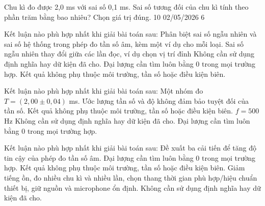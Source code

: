 \begin{ex}
Chu kì đo được 2,0 ms với sai số 0,1 ms. Sai số tương đối của chu kì tính theo phần trăm bằng bao nhiêu? Chọn giá trị đúng.
\choice
{10}
{02/05/2026}
{6}
{}
\end{ex}

\begin{ex}
Kết luận nào phù hợp nhất khi giải bài toán sau: Phân biệt sai số ngẫu nhiên và sai số hệ thống trong phép đo tần số âm, kèm một ví dụ cho mỗi loại.
\choice
{\True Sai số ngẫu nhiên thay đổi giữa các lần đọc, ví dụ chọn vị trí đỉnh}
{Không cần sử dụng định nghĩa hay dữ kiện đã cho.}
{Đại lượng cần tìm luôn bằng 0 trong mọi trường hợp.}
{Kết quả không phụ thuộc môi trường, tần số hoặc điều kiện biên.}
\end{ex}

\begin{ex}
Kết luận nào phù hợp nhất khi giải bài toán sau: Một nhóm đo $T=(2,00\pm0,04)$ ms. Ước lượng tần số và độ không đảm bảo tuyệt đối của tần số.
\choice
{Kết quả không phụ thuộc môi trường, tần số hoặc điều kiện biên.}
{\True $f=500$ Hz}
{Không cần sử dụng định nghĩa hay dữ kiện đã cho.}
{Đại lượng cần tìm luôn bằng 0 trong mọi trường hợp.}
\end{ex}

\begin{ex}
Kết luận nào phù hợp nhất khi giải bài toán sau: Đề xuất ba cải tiến để tăng độ tin cậy của phép đo tần số âm.
\choice
{Đại lượng cần tìm luôn bằng 0 trong mọi trường hợp.}
{Kết quả không phụ thuộc môi trường, tần số hoặc điều kiện biên.}
{\True Giảm tiếng ồn, đo nhiều chu kì và nhiều lần, chọn thang thời gian phù hợp/hiệu chuẩn thiết bị, giữ nguồn và microphone ổn định.}
{Không cần sử dụng định nghĩa hay dữ kiện đã cho.}
\end{ex}

